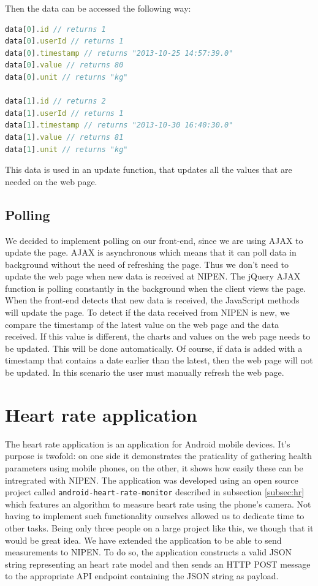 Then the data can be accessed the following way:
\begin{lstlisting}[language=JavaScript]
data[0].id // returns 1
data[0].userId // returns 1
data[0].timestamp // returns "2013-10-25 14:57:39.0"
data[0].value // returns 80
data[0].unit // returns "kg"

data[1].id // returns 2
data[1].userId // returns 1
data[1].timestamp // returns "2013-10-30 16:40:30.0"
data[1].value // returns 81
data[1].unit // returns "kg"
\end{lstlisting}

This data is used in an update function, that updates all the values that are needed on the web page.

\subsection{Polling}

We decided to implement polling on our front-end, since we are using AJAX to update the page.
AJAX is asynchronous which means that it can poll data in background without the need of refreshing the page.
Thus we don't need to update the web page when new data is received at NIPEN.
The jQuery AJAX function is polling constantly in the background when the client views the page.
When the front-end detects that new data is received, the JavaScript methods will update the page.
To detect if the data received from NIPEN is new, we compare the timestamp of the latest value on the web page and the data received.
If this value is different, the charts and values on the web page needs to be updated.
This will be done automatically.
Of course, if data is added with a timestamp that contains a date earlier than the latest, then the web page 
will not be updated.
In this scenario the user must manually refresh the web page.

\section{Heart rate application}

The heart rate application is an application for Android mobile devices.
It's purpose is twofold: on one side it demonstrates the praticality of gathering health parameters using mobile phones,
on the other, it shows how easily these can be intregrated with NIPEN. %
The application was developed using an open source project called \verb|android-heart-rate-monitor| described
in subsection \ref{subsec:hr} which features an algorithm to measure heart rate using the phone's camera.
Not having to implement such functionality ourselves allowed us to dedicate time to other tasks.
Being only three people on a large project like this, we though that it would be great idea.
We have extended the application to be able to send measurements to NIPEN.
To do so, the application constructs a valid JSON string representing an heart rate model and then
sends an HTTP POST message to the appropriate API endpoint containing the JSON string as payload.

